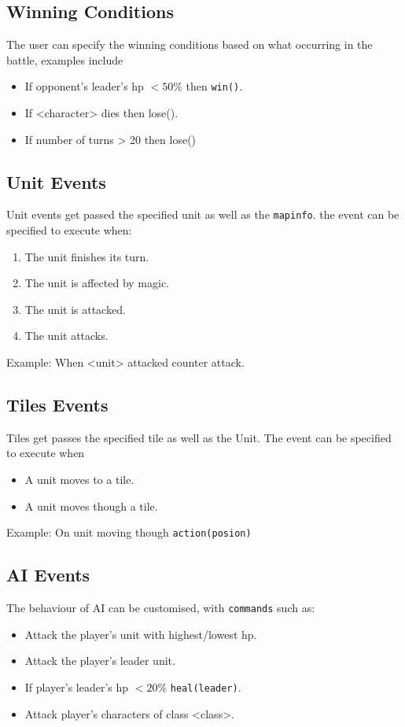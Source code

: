 \subsection{Winning Conditions}
The user can specify the winning conditions based on what occurring in the battle, examples include
\begin{itemize}
	\item If opponent's leader's hp $< 50\%$ then \texttt{win()}.
	\item If <character> dies then lose().
	\item If number of turns > 20 then lose()
\end{itemize} 

\subsection{Unit Events}

Unit events get passed the specified unit as well as the \texttt{mapinfo}. the event can be specified to execute when:
\begin{enumerate}
	\item The unit finishes its turn.
	\item The unit is affected by magic.
	\item The unit is attacked.
	\item The unit attacks.
\end{enumerate}
Example: When <unit> attacked counter attack.


\subsection{Tiles Events}

Tiles get passes the specified tile as well as the Unit. The event can be specified to execute when
\begin{itemize}
	\item A unit moves to a tile.
	\item A unit moves though a tile.
\end{itemize}

Example: On unit moving though \texttt{action(posion)}

\subsection{AI Events}

The behaviour of AI can be customised, with \texttt{commands} such as:
\begin{itemize}
	\item Attack the player's unit with  highest/lowest hp.
	\item Attack the player's leader unit.
	\item If player's leader's hp $< 20\%$ \texttt{heal(leader)}.
	\item Attack player's characters of class <class>.
\end{itemize}

